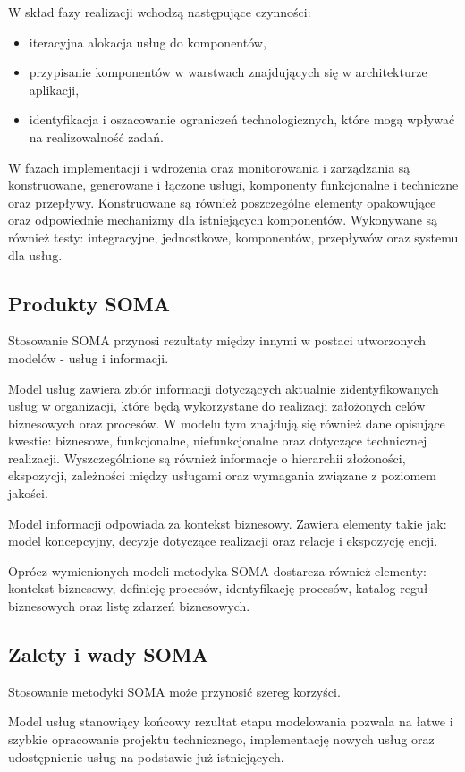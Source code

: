 W skład fazy realizacji wchodzą następujące czynności:
\begin{itemize}
\item{iteracyjna alokacja usług do komponentów,}
\item{przypisanie komponentów w warstwach znajdujących się w architekturze aplikacji,}
\item{identyfikacja i oszacowanie ograniczeń technologicznych, które mogą wpływać na realizowalność zadań.}
\end{itemize}

W fazach implementacji i wdrożenia oraz monitorowania i zarządzania są konstruowane, generowane i łączone usługi, komponenty funkcjonalne i techniczne oraz przepływy. Konstruowane są również poszczególne elementy opakowujące oraz odpowiednie mechanizmy dla istniejących komponentów. Wykonywane są również testy: integracyjne, jednostkowe, komponentów, przepływów oraz systemu dla usług. \cite{PlatIntGor, SOMAArsIBMJour}

\subsection{Produkty SOMA}
Stosowanie SOMA przynosi rezultaty między innymi w postaci utworzonych modelów - usług i informacji. 

Model usług zawiera zbiór informacji dotyczących aktualnie zidentyfikowanych usług w organizacji, które będą wykorzystane do realizacji założonych celów biznesowych oraz procesów. W modelu tym znajdują się również dane opisujące kwestie: biznesowe, funkcjonalne, niefunkcjonalne oraz dotyczące technicznej realizacji. Wyszczególnione są również informacje o hierarchii złożoności, ekspozycji, zależności między usługami oraz wymagania związane z poziomem jakości. 

Model informacji odpowiada za kontekst biznesowy. Zawiera elementy takie jak: model koncepcyjny, decyzje dotyczące realizacji oraz relacje i ekspozycję encji.

Oprócz wymienionych modeli metodyka SOMA dostarcza również elementy: kontekst biznesowy, definicję procesów, identyfikację procesów, katalog reguł biznesowych oraz listę zdarzeń biznesowych.

\subsection{Zalety i wady SOMA}
Stosowanie metodyki SOMA może przynosić szereg korzyści. 

Model usług stanowiący końcowy rezultat etapu modelowania pozwala na łatwe i szybkie opracowanie projektu technicznego, implementację nowych usług oraz udostępnienie usług na podstawie już istniejących. 


